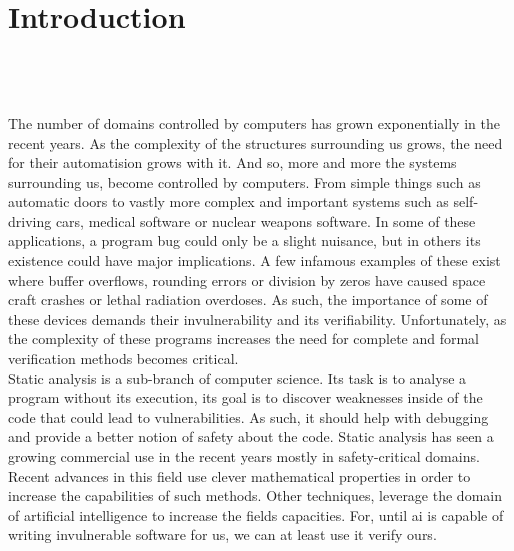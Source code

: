 
\setcounter{chapter}{0}

\chapter{Introduction}
\mbox{}\\
\mbox{}\\
\mbox{}\\
The number of domains controlled by computers has grown exponentially in the recent years. As the complexity of the structures surrounding us grows, the need for their automatision grows with it. And so, more and more the systems surrounding us, become controlled by computers. From simple things such as automatic doors to vastly more complex and important systems such as self-driving cars, medical software or nuclear weapons software. In some of these applications, a program bug could only be a slight nuisance, but in others its existence could have major implications. A few infamous examples of these exist where buffer overflows, rounding errors or division by zeros have caused space craft crashes or lethal radiation overdoses. As such, the importance of some of these devices demands their invulnerability and its verifiability. Unfortunately, as the complexity of these programs increases the need for complete and formal verification methods becomes critical.\\
Static analysis is a sub-branch of computer science. Its task is to analyse a program without its execution, its goal is to discover weaknesses inside of the code that could lead to vulnerabilities. As such, it should help with debugging and provide a better notion of safety about the code. Static analysis has seen a growing commercial use in the recent years mostly in safety-critical domains. Recent advances in this field use clever mathematical properties in order to increase the capabilities of such methods. Other techniques, leverage the domain of artificial intelligence to increase the fields capacities. For, until ai is capable of writing invulnerable software for us, we can at least use it verify ours.
